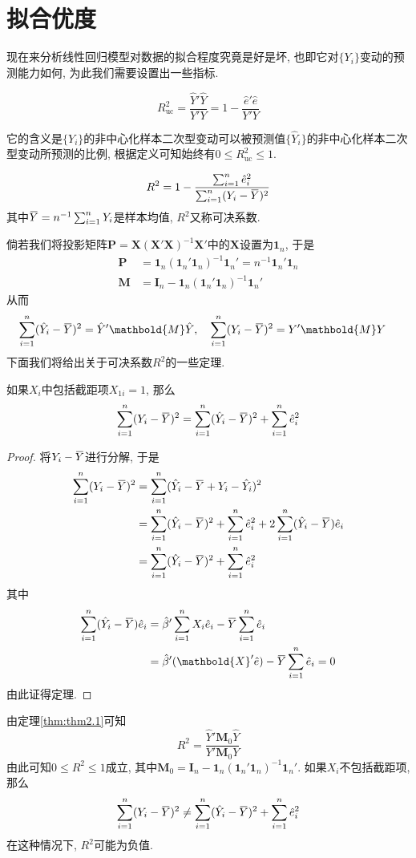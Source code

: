 \documentclass[cn, 12pt, math=mtpro2, bibstyle=apa, blue, twocol]{elegantbook}
\newcommand{\X}{\mathbold{X}}
\newcommand{\overbar}[1]{\mkern 1.5mu\overline{\mkern-1.5mu#1\mkern-1.5mu}\mkern 1.5mu}
\begin{document}
\section{拟合优度}
现在来分析线性回归模型对数据的拟合程度究竟是好是坏, 也即它对$\{Y_i\}$变动的预测能力如何, 为此我们需要设置出一些指标.
\begin{definition}[非中心化$R^2$]
$$R^2_{\text{uc}}=\frac{\hat{Y}'\hat{Y}}{Y'Y}=1-\frac{\hat{e}'\hat{e}}{Y'Y}$$
\end{definition}
它的含义是$\{Y_i\}$的非中心化样本二次型变动可以被预测值$\{\hat{Y}_i\}$的非中心化样本二次型变动所预测的比例, 根据定义可知始终有$0\leq R_{\text{uc}}^2\leq1$.
\begin{definition}[中心化$R^2$]
$$R^2=1-\frac{\sum_{i=1}^{n}\hat{e}_i^2}{\sum_{i=1}^{n}(Y_i-\overbar{Y})^2}$$
其中$\overbar{Y}=n^{-1}\sum_{i=1}^{n}Y_i$是样本均值, $R^2$又称可决系数.
\end{definition}
倘若我们将投影矩阵$\mathbold{P}=\X(\X'\X)^{-1}\X'$中的$\X$设置为$\mathbf{1}_n$, 于是
\begin{align*}
\mathbold{P}&=\mathbf{1}_n(\mathbf{1}_n'\mathbf{1}_n)^{-1}\mathbf{1}_n'=n^{-1}\mathbf{1}_n'\mathbf{1}_n \\
\mathbold{M}&=\mathbold{I}_n-\mathbf{1}_n(\mathbf{1}_n'\mathbf{1}_n)^{-1}\mathbf{1}_n'
\end{align*}
从而
\begin{align*}
\sum_{i=1}^{n}(\hat{Y}_i-\overbar{Y})^2&=\hat{Y}'\mathbold{M}\hat{Y},\quad\sum_{i=1}^{n}(Y_i-\overbar{Y})^2=Y'\mathbold{M}Y
\end{align*}
下面我们将给出关于可决系数$R^2$的一些定理.
\begin{theorem}\label{thm:thm2.1}
  如果$X_{i}$中包括截距项$X_{1i}=1$, 那么
  $$\sum_{i=1}^{n}(Y_i-\overbar{Y})^2=\sum_{i=1}^{n}(\hat{Y}_i-\overbar{Y})^2+\sum_{i=1}^{n}\hat{e}_i^2$$
\end{theorem}
\begin{proof}
  将$Y_i-\overbar{Y}$进行分解, 于是
  \begin{align*}
  \sum_{i=1}^{n}(Y_i-\overbar{Y})^2&=\sum_{i=1}^{n}(\hat{Y}_i-\overbar{Y}+Y_i-\hat{Y}_i)^2 \\
  &=\sum_{i=1}^{n}(\hat{Y}_i-\overbar{Y})^2+\sum_{i=1}^{n}\hat{e}_i^2+2\sum_{i=1}^{n}(\hat{Y}_i-\overbar{Y})\hat{e}_i \\
  &=\sum_{i=1}^{n}(\hat{Y}_i-\overbar{Y})^2+\sum_{i=1}^{n}\hat{e}_i^2
  \end{align*}
  其中
  \begin{align*}
  \sum_{i=1}^{n}(\hat{Y}_i-\overbar{Y})\hat{e}_i&=\hat{\beta}'\sum_{i=1}^{n}X_i\hat{e}_i-\overbar{Y}\sum_{i=1}^{n}\hat{e}_i \\
  &=\hat{\beta}'(\X'\hat{e})-\overbar{Y}\sum_{i=1}^{n}\hat{e}_i=0
  \end{align*}
  由此证得定理.
\end{proof}
由定理\ref{thm:thm2.1}可知
$$R^2=\frac{\hat{Y}'\mathbold{M}_0\hat{Y}}{Y'\mathbold{M}_0Y}$$
由此可知$0\leq R^2\leq1$成立, 其中$\mathbold{M}_0=\mathbold{I}_n-\mathbf{1}_n(\mathbf{1}_n'\mathbf{1}_n)^{-1}\mathbf{1}_n'$. 如果$X_i$不包括截距项, 那么
$$\sum_{i=1}^{n}(Y_i-\overbar{Y})^2\neq \sum_{i=1}^{n}(\hat{Y}_i-\overbar{Y})^2+\sum_{i=1}^{n}\hat{e}_i^2$$
在这种情况下, $R^2$可能为负值.
\end{document}
